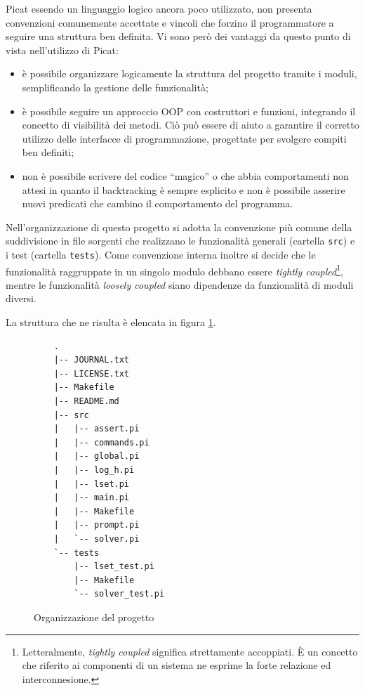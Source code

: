 \documentclass[12pt,a4paper,openright]{book} %
\begin{document}
Picat essendo un linguaggio logico ancora poco utilizzato, non
presenta convenzioni comunemente accettate e vincoli che forzino il
programmatore a seguire una struttura ben definita. Vi sono però dei
vantaggi da questo punto di vista nell'utilizzo di Picat:
\begin{itemize}
	\item è possibile organizzare logicamente la struttura del
          progetto tramite i moduli, semplificando la gestione delle
          funzionalità;
	\item è possibile seguire un approccio OOP con costruttori e
          funzioni, integrando il concetto di visibilità dei
          metodi. Ciò può essere di aiuto a garantire il corretto
          utilizzo delle interfacce di programmazione, progettate per
          svolgere compiti ben definiti;
	\item non è possibile scrivere del codice ``magico'' o che
          abbia comportamenti non attesi in quanto il backtracking è
          sempre esplicito e non è possibile asserire nuovi predicati
          che cambino il comportamento del programma.
\end{itemize}

Nell'organizzazione di questo progetto si adotta la convenzione più
comune della suddivisione in file sorgenti che realizzano le
funzionalità generali (cartella \texttt{src}) e i test (cartella
\texttt{tests}). Come convenzione interna inoltre si decide che le
funzionalità raggruppate in un singolo modulo debbano essere
\textit{tightly coupled}\footnote{Letteralmente, \textit{tightly
    coupled} significa strettamente accoppiati. \`E un concetto che
  riferito ai componenti di un sistema ne esprime la forte relazione
  ed interconnesione.}, mentre le funzionalità \textit{loosely
  coupled} siano dipendenze da funzionalità di moduli diversi.

La struttura che ne risulta è elencata in figura
\ref{fig:proj_folder_structure}.

\begin{figure}[]
	\label{fig:proj_folder_structure}
	\begin{verbatim}
	.
	|-- JOURNAL.txt
	|-- LICENSE.txt
	|-- Makefile
	|-- README.md
	|-- src
	|   |-- assert.pi
	|   |-- commands.pi
	|   |-- global.pi
	|   |-- log_h.pi
	|   |-- lset.pi
	|   |-- main.pi
	|   |-- Makefile
	|   |-- prompt.pi
	|   `-- solver.pi
	`-- tests
	    |-- lset_test.pi
	    |-- Makefile
	    `-- solver_test.pi
	\end{verbatim}
	\caption{Organizzazione del progetto}
\end{figure}
\end{document}
